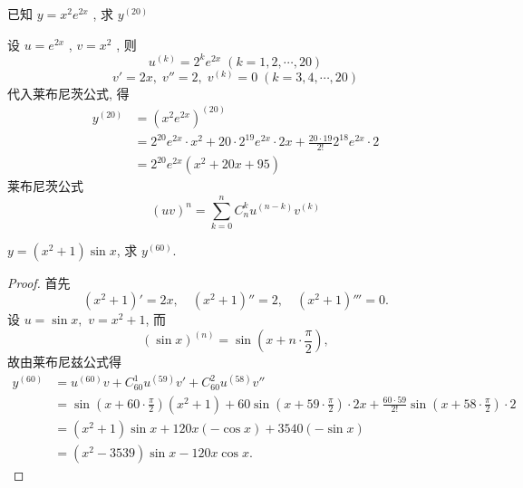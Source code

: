\documentclass[color=green,titlestyle=hang]{elegantbook}%
\begin{document}
\begin{exercise}  已知 $\displaystyle y=x^2e^{2x}$ , 求 $\displaystyle y^{(20)}$\\[-3mm]
\end{exercise}\begin{Solution}设 $\displaystyle u=e^{2x}$ , $\displaystyle v=x^2$ ,  则
\begin{equation*}u^{(k)}=2^ke^{2x}\;(k=1,2,\cdots,20)\end{equation*}
\begin{equation*}v'=2x,\;v''=2,\;v^{(k)}=0\;(k=3,4,\cdots,20)\end{equation*}
代入莱布尼茨公式, 得\begin{align*}y^{(20)}&=(x^2e^{2x})^{(20)}\\
&=2^{20}e^{2x}\cdot x^2+20\cdot2^{19}e^{2x}\cdot2x+\frac{20\cdot19}{2!}2^{18}e^{2x}\cdot2\\
&=2^{20}e^{2x}(x^2+20x+95)
\end{align*}
莱布尼茨公式\begin{equation*}(uv)^{n}=\sum_{k=0}^{n}C_n^ku^{(n-k)}v^{(k)}\end{equation*}	
\end{Solution}

\begin{example}
$y=(x^2+1)\sin x$, 求 $y^{(60)}.$
\end{example}\begin{proof}
首先 $$(x^2+1)'=2x,\quad(x^2+1)''=2,\quad(x^2+1)'''=0.$$ 设 $u=\sin x,$ $v=x^2+1$, 而 $$(\sin x)^{(n)}=\sin \left(x+n\cdot \frac {\pi}{2}\right),$$
故由莱布尼兹公式得\begin{align*}
y^{(60)}&=u^{(60)}v+C_{60}^1 u^{(59)}v'+C_{60}^2 u^{(58)}v''\\
&=\sin \left(x+60\cdot\frac {\pi}{2}\right)(x^2+1)+60 \sin \left(x+59\cdot\frac {\pi}{2}\right)\cdot 2x+\frac {60\cdot 59}{2!}\sin \left(x+58\cdot\frac {\pi}{2}\right)\cdot 2\\
&=(x^2+1)\sin x+120x(-\cos x)+3540(-\sin x)\\
&=(x^2-3539)\sin x-120x\cos x.
\end{align*}
\end{proof}
\end{document}
